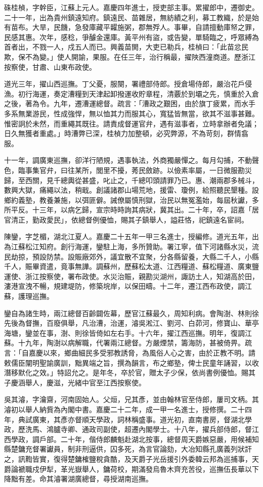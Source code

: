 \begin{pinyinscope}
硃桂楨，字幹臣，江蘇上元人。嘉慶四年進士，授吏部主事。累擢郎中，遷御史。二十一年，出為貴州鎮遠知府。鎮遠民、苗雜居，無紡績之利，募工教織，於是始有苗布。大旱，民饑，急發庫藏平糶施粥，郡無殍人。事畢，自請擅動庫帑之罪，民感其惠。次年，感稔，爭醵金還庫。黃平州有盜，或告變，單騎臨之，呼眾縛為首者出，不戮一人，戍五人而已。興義苗閧，大吏已勒兵，桂楨曰：「此苗忿民欺，保不為變。」使人開諭，果服。在任三年，治行稱最，擢陜西潼商道。歷浙江按察使，甘肅、山東布政使。

道光三年，擢山西巡撫。丁父憂，服闋，署禮部侍郎。授倉場侍郎，嚴治花戶侵漁。初行海運，奏定漕糧到天津起卸撥運收貯章程，清覈於到壩之先，慎重於入倉之後，著為令。九年，遷漕運總督。疏言：「漕政之艱困，由於旗丁疲累，而水手多系無業游民，性成強悍，無以恤其力而服其心，寬猛皆無當，欲其不滋事甚難。惟密詗於未然，而重繩其既往。請責成督運官弁，遇有滋事者，立時拿辦者免議；日久無獲者重處。」時漕弊已深，桂楨力加整頓，必究弊源，不為苛刻，群情翕服。

十一年，調廣東巡撫，卻洋行陋規，遇事執法，外商獨嚴憚之。每月勾捕，不動聲色，臨事集官弁，曰往某所，閭里不擾，莠民斂跡。以儉素率屬，一日微服勘災歸，至西關，見千總輿從甚盛，叱止之，千總叩頭請罪乃已。惠、潮兩郡多械斗，數興大獄，痛繩以法，稍戢。創議諸郡山場荒地，援雷、瓊例，給照聽民墾種。設鄉約義塾，教養兼施，以弭匪僻。誡僚屬慎刑獄，治民以無冤濫始，每屆秋讞，多所平反。十三年，以病乞歸，宣宗時時詢其病狀，冀其出。二十年，卒，詔嘉「居官清正，勤政愛民」，依總督例優恤，賜其子鎮舉人，謚莊恪，祀鎮遠名宦祠。

陳鑾，字芝楣，湖北江夏人。嘉慶二十五年一甲三名進士，授編修。道光五年，出為江蘇松江知府。創行海運，鑾駐上海，多所贊助。署江寧，值下河諸縣水災，流民劫掠，預設防禁。設賑廠郊外，議宜散不宜聚，分各縣留養，大縣二千人，小縣千人，賑畢資遣，竟事無譁。調蘇州，歷蘇松太道、江西糧道、蘇松糧道、廣東鹽運使、浙江按察使，署布政使。水災治賑，親勘災湖州，諏訪土人，知湖高於田，漊港宣洩不暢，規建堤防，修築垸岸，以保田疇。十二年，遷江西布政使，調江蘇，護理巡撫。

鑾自為諸生時，兩江總督百齡闢佐幕，歷官江蘇最久，周知利病。會陶澍、林則徐先後為督撫，百廢俱舉，凡治漕，治運，濬吳淞江、劉河、白茆河，修寶山、華亭海塘，鑾並在事，澍、則徐皆倚如左右手。十六年，擢江西巡撫。明年，復調江蘇。十九年，陶澍以病解職，代署兩江總督。方嚴煙禁，籌海防，甚被倚畀。疏言：「自嘉慶以來，鄉曲細民多受邪教誘脅，為風俗人心之害，由於正教不明。請敕儒臣闡明聖諭廣訓，黜異端之旨，撰為韻言，布之鄉塾，俾士民童年誦習，以收潛移默化之效。」特詔允之。是年冬，卒於官，贈太子少保，依尚書例優恤。賜其子慶涵舉人，慶滋，光緒中官至江西按察使。

吳其濬，字瀹齋，河南固始人。父烜，兄其彥，並由翰林官至侍郎，屢司文柄。其濬初以舉人納貲為內閣中書。嘉慶二十二年，成一甲一名進士，授修撰。二十四年，典試廣東，其彥亦督順天學政，詞林稱盛事。道光初，直南書房，督湖北學政，歷洗馬、鴻臚寺卿、通政司副使，超遷內閣學士。十八年，擢兵部侍郎，督江西學政，調戶部。二十年，偕侍郎麟魁赴湖北按事，總督周天爵嫉惡嚴，用候補知縣楚鏞充督署讞員，制非刑逼供，囚多死，為言官論劾，大冶知縣孔廣義列狀訐之，訊鞫皆實，復得楚鏞榷鹽稅貪酷，及天爵子光岳援引外委韓云邦為巡捕事，天爵論褫職戍伊犁，革光嶽舉人，鏞荷校，期滿發烏魯木齊充苦役，巡撫伍長華以下降黜有差。命其濬署湖廣總督，尋授湖南巡撫。


\end{pinyinscope}
